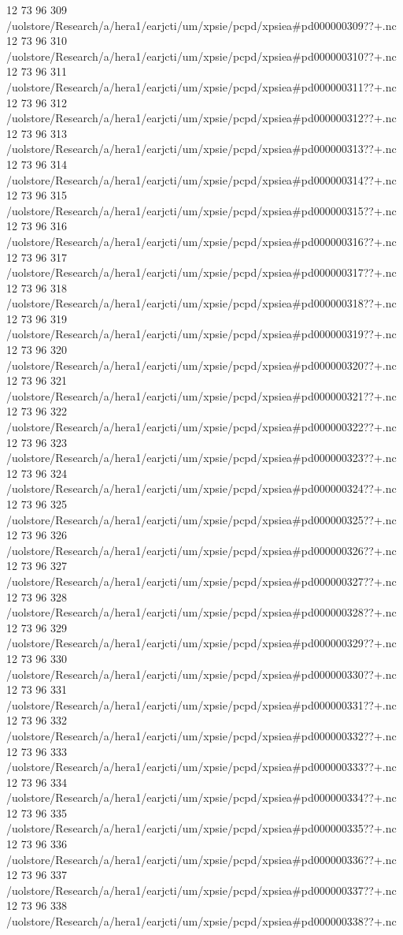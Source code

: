 12 73 96
309
/uolstore/Research/a/hera1/earjcti/um/xpsie/pcpd/xpsiea#pd000000309??+.nc
12 73 96
310
/uolstore/Research/a/hera1/earjcti/um/xpsie/pcpd/xpsiea#pd000000310??+.nc
12 73 96
311
/uolstore/Research/a/hera1/earjcti/um/xpsie/pcpd/xpsiea#pd000000311??+.nc
12 73 96
312
/uolstore/Research/a/hera1/earjcti/um/xpsie/pcpd/xpsiea#pd000000312??+.nc
12 73 96
313
/uolstore/Research/a/hera1/earjcti/um/xpsie/pcpd/xpsiea#pd000000313??+.nc
12 73 96
314
/uolstore/Research/a/hera1/earjcti/um/xpsie/pcpd/xpsiea#pd000000314??+.nc
12 73 96
315
/uolstore/Research/a/hera1/earjcti/um/xpsie/pcpd/xpsiea#pd000000315??+.nc
12 73 96
316
/uolstore/Research/a/hera1/earjcti/um/xpsie/pcpd/xpsiea#pd000000316??+.nc
12 73 96
317
/uolstore/Research/a/hera1/earjcti/um/xpsie/pcpd/xpsiea#pd000000317??+.nc
12 73 96
318
/uolstore/Research/a/hera1/earjcti/um/xpsie/pcpd/xpsiea#pd000000318??+.nc
12 73 96
319
/uolstore/Research/a/hera1/earjcti/um/xpsie/pcpd/xpsiea#pd000000319??+.nc
12 73 96
320
/uolstore/Research/a/hera1/earjcti/um/xpsie/pcpd/xpsiea#pd000000320??+.nc
12 73 96
321
/uolstore/Research/a/hera1/earjcti/um/xpsie/pcpd/xpsiea#pd000000321??+.nc
12 73 96
322
/uolstore/Research/a/hera1/earjcti/um/xpsie/pcpd/xpsiea#pd000000322??+.nc
12 73 96
323
/uolstore/Research/a/hera1/earjcti/um/xpsie/pcpd/xpsiea#pd000000323??+.nc
12 73 96
324
/uolstore/Research/a/hera1/earjcti/um/xpsie/pcpd/xpsiea#pd000000324??+.nc
12 73 96
325
/uolstore/Research/a/hera1/earjcti/um/xpsie/pcpd/xpsiea#pd000000325??+.nc
12 73 96
326
/uolstore/Research/a/hera1/earjcti/um/xpsie/pcpd/xpsiea#pd000000326??+.nc
12 73 96
327
/uolstore/Research/a/hera1/earjcti/um/xpsie/pcpd/xpsiea#pd000000327??+.nc
12 73 96
328
/uolstore/Research/a/hera1/earjcti/um/xpsie/pcpd/xpsiea#pd000000328??+.nc
12 73 96
329
/uolstore/Research/a/hera1/earjcti/um/xpsie/pcpd/xpsiea#pd000000329??+.nc
12 73 96
330
/uolstore/Research/a/hera1/earjcti/um/xpsie/pcpd/xpsiea#pd000000330??+.nc
12 73 96
331
/uolstore/Research/a/hera1/earjcti/um/xpsie/pcpd/xpsiea#pd000000331??+.nc
12 73 96
332
/uolstore/Research/a/hera1/earjcti/um/xpsie/pcpd/xpsiea#pd000000332??+.nc
12 73 96
333
/uolstore/Research/a/hera1/earjcti/um/xpsie/pcpd/xpsiea#pd000000333??+.nc
12 73 96
334
/uolstore/Research/a/hera1/earjcti/um/xpsie/pcpd/xpsiea#pd000000334??+.nc
12 73 96
335
/uolstore/Research/a/hera1/earjcti/um/xpsie/pcpd/xpsiea#pd000000335??+.nc
12 73 96
336
/uolstore/Research/a/hera1/earjcti/um/xpsie/pcpd/xpsiea#pd000000336??+.nc
12 73 96
337
/uolstore/Research/a/hera1/earjcti/um/xpsie/pcpd/xpsiea#pd000000337??+.nc
12 73 96
338
/uolstore/Research/a/hera1/earjcti/um/xpsie/pcpd/xpsiea#pd000000338??+.nc
